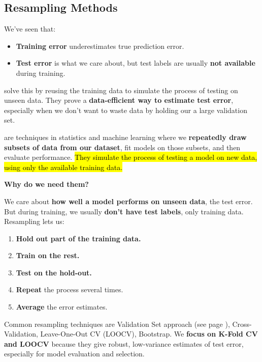 \subsection{Resampling Methods}

We've seen that:
\begin{itemize}
    \item \textbf{Training error} underestimates true prediction error.
    \item \textbf{Test error} is what we care about, but test labels are usually \textbf{not available} during training.
\end{itemize}
 solve this by reusing the training data to simulate the process of testing on unseen data. They prove a \textbf{data-efficient way to estimate test error}, especially when we don't want to waste data by holding our a large validation set.

\highspace
{} are techniques in statistics and machine learning where we \textbf{repeatedly draw subsets of data from our dataset}, fit models on those subsets, and then evaluate performance. \hl{They simulate the process of testing a model on new data, using only the available training data.}

\highspace
\begin{flushleft}
    \textcolor{Green3}{ \textbf{Why do we need them?}}
\end{flushleft}
We care about \textbf{how well a model performs on unseen data}, the test error. But during training, we usually \textbf{don't have test labels}, only training data. Resampling lets us:
\begin{enumerate}
    \item \textbf{Hold out part of the training data.}
    \item \textbf{Train on the rest.}
    \item \textbf{Test on the hold-out.}
    \item \textbf{Repeat} the process several times.
    \item \textbf{Average} the error estimates.
\end{enumerate}
Common resampling techniques are Validation Set approach (see page \pageref{paragraph: Validation Set}), Cross-Validation, Leave-One-Out CV (LOOCV), Bootstrap. We \textbf{focus on K-Fold CV and LOOCV} because they give robust, low-variance estimates of test error, especially for model evaluation and selection.